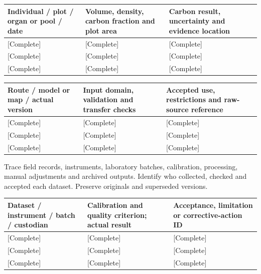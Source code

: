 {\sffamily\fontsize{8.6}{10.7}\selectfont\begin{longtable}{@{}P{48mm}P{61mm}P{53mm}@{}}
\toprule
\textbf{Individual / plot / organ or pool / date} & \textbf{Volume, density, carbon fraction and plot area} & \textbf{Carbon result, uncertainty and evidence location}\\\midrule\endhead
\rule{0pt}{8mm}[Complete] & [Complete] & [Complete]\\\hline
\rule{0pt}{8mm}[Complete] & [Complete] & [Complete]\\\hline
\rule{0pt}{8mm}[Complete] & [Complete] & [Complete]\\\hline
\end{longtable}}
{\sffamily\fontsize{8.6}{10.7}\selectfont\begin{longtable}{@{}P{48mm}P{61mm}P{53mm}@{}}
\toprule
\textbf{Route / model or map / actual version} & \textbf{Input domain, validation and transfer checks} & \textbf{Accepted use, restrictions and raw-source reference}\\\midrule\endhead
\rule{0pt}{8mm}[Complete] & [Complete] & [Complete]\\\hline
\rule{0pt}{8mm}[Complete] & [Complete] & [Complete]\\\hline
\rule{0pt}{8mm}[Complete] & [Complete] & [Complete]\\\hline
\end{longtable}}
Trace field records, instruments, laboratory batches, calibration, processing, manual adjustments and archived outputs. Identify who collected, checked and accepted each dataset. Preserve originals and superseded versions.\par
{}
{\sffamily\fontsize{8.6}{10.7}\selectfont\begin{longtable}{@{}P{48mm}P{61mm}P{53mm}@{}}
\toprule
\textbf{Dataset / instrument / batch / custodian} & \textbf{Calibration and quality criterion; actual result} & \textbf{Acceptance, limitation or corrective-action ID}\\\midrule\endhead
\rule{0pt}{8mm}[Complete] & [Complete] & [Complete]\\\hline
\rule{0pt}{8mm}[Complete] & [Complete] & [Complete]\\\hline
\rule{0pt}{8mm}[Complete] & [Complete] & [Complete]\\\hline
\end{longtable}}

